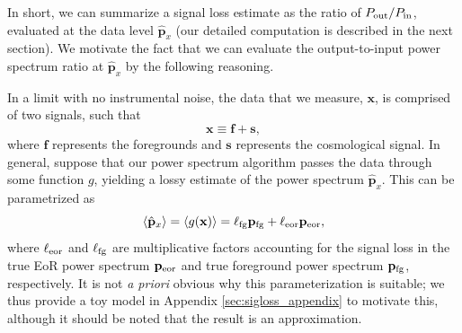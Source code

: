 \documentclass[preprint2,numberedappendix,tighten]{aastex6}  %
\newcommand{\x}{\mathbf{x}}
\newcommand{\f}{\mathbf{f}}
\newcommand{\s}{\mathbf{s}}
\newcommand{\p}{\mathbf{p}}
\newcommand{\phat}{\hat{\mathbf{p}}}
\begin{document}
In short, we can summarize a signal loss estimate as the ratio of $P_{\rm out}/P_{\rm in}$, evaluated at the data level $\hat{\textbf{p}}_{x}$ (our detailed computation is described in the next section). We motivate the fact that we can evaluate the output-to-input power spectrum ratio at $\hat{\textbf{p}}_{x}$ by the following reasoning.

In a limit with no instrumental noise, the data that we measure, $\x$, is comprised of two signals, such that
\begin{equation}
\x \equiv \f + \s,
\end{equation}
where $\mathbf{f}$ represents the foregrounds and $\mathbf{s}$ represents the cosmological signal. In general, suppose that our power spectrum algorithm passes the data through some function $g$, yielding a lossy estimate of the power spectrum $\phat_{x}$. This can be parametrized as
\begin{equation}
\label{eq:LinearPspecSum}
\langle \phat_{x} \rangle  = \langle g(\x) \rangle = \ell_{\rm fg} \p_{\rm fg} + \ell_{\rm eor} \p_{\rm eor},
\end{equation}
where $\ell_{\rm eor}$ and $\ell_{\rm fg}$ are multiplicative factors accounting for the signal loss in the true EoR power spectrum $\p_{\rm eor}$ and true foreground power spectrum $\p_{\rm fg}$, respectively. It is not \emph{a priori} obvious why this parameterization is suitable; we thus provide a toy model in Appendix \ref{sec:sigloss_appendix} to motivate this, although it should be noted that the result is an approximation.
\end{document}
